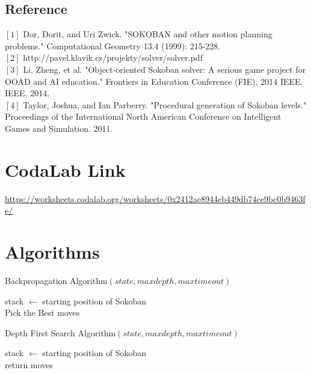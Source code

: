 \documentclass[10pt, final]{article}
\begin{document}
\begin{multicols}{2}
\section{Reference}
$[1]$ Dor, Dorit, and Uri Zwick. "SOKOBAN and other motion planning problems." Computational Geometry 13.4 (1999): 215-228.\\
$[2]$ http://pavel.klavik.cz/projekty/solver/solver.pdf \\
$[3]$ Li, Zheng, et al. "Object-oriented Sokoban solver: A serious game project for OOAD and AI education." Frontiers in Education Conference (FIE), 2014 IEEE. IEEE, 2014. \\
$[4]$ Taylor, Joshua, and Ian Parberry. "Procedural generation of Sokoban levels." Proceedings of the International North American Conference on Intelligent Games and Simulation. 2011.
\end{multicols}
\section{CodaLab Link}
\href{https://worksheets.codalab.org/worksheets/0x2412ae8944eb449db74ce9bc0b9463fe/}{https://worksheets.codalab.org/worksheets/0x2412ae8944eb449db74ce9bc0b9463fe/}
	\section{Algorithms}
	\begin{algorithm}\label{back}\small
	\caption{\small Backpropagation Algorithm$(state, maxdepth, maxtimeout)$}
	stack $\gets$ starting position of Sokoban \\
	Pick the Best moves
\end{algorithm}

\begin{algorithm}\label{DFS}\small
	\caption{\small Depth First Search Algorithm$(state, maxdepth, maxtimeout)$}
	stack $\gets$ starting position of Sokoban \\
	return moves
\end{algorithm}
\end{document}
